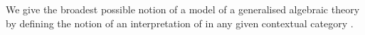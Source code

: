 \newcommand{\gatdisplayrule}[2]
{
\setlength{\fboxsep}{1pt}
\setlength{\fboxrule}{0pt}
\fbox{$\displaystyle \frac{#1}{#2}$}
}
\newcommand{\Isort}{I_{sort}}
\newcommand{\Iop}{I_{op}}
\newcommand {\Ihat}{\hat{I}}

\renewcommand{\crossx}[3]{#1 \underset{\tiny #3}{\cross} #2}
\newcommand{\fonestar}   {{f_1}\kern-.15em^*}
\newcommand{\ftwostar}   {{f_2}\kern-.15em^*}
\newcommand{\fjstar}     {{f_j}\kern-.2em^*}
\newcommand{\fjpstar}    {{f_{j-1}}\kern-.25em^*}
\newcommand{\smstar}{{s_m}\kern-.25em^*}
\newcommand{\sonestar}{{s_1}\kern-.15em^*}


\note
We give the broadest possible notion of a model
of a generalised algebraic theory \gatUw by defining the notion of an interpretation of  \gatUw in  any given contextual category \catc.


